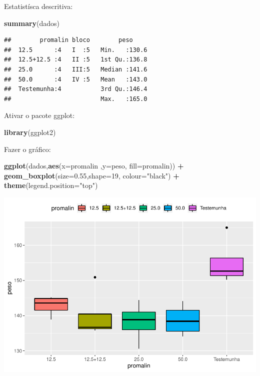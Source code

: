 \documentclass[
]{book}
\newenvironment{Shaded}{\begin{snugshade}}{\end{snugshade}}
\newcommand{\DataTypeTok}[1]{\textcolor[rgb]{0.13,0.29,0.53}{#1}}
\newcommand{\DecValTok}[1]{\textcolor[rgb]{0.00,0.00,0.81}{#1}}
\newcommand{\FloatTok}[1]{\textcolor[rgb]{0.00,0.00,0.81}{#1}}
\newcommand{\KeywordTok}[1]{\textcolor[rgb]{0.13,0.29,0.53}{\textbf{#1}}}
\newcommand{\NormalTok}[1]{#1}
\newcommand{\OperatorTok}[1]{\textcolor[rgb]{0.81,0.36,0.00}{\textbf{#1}}}
\newcommand{\StringTok}[1]{\textcolor[rgb]{0.31,0.60,0.02}{#1}}
\begin{document}
Estatistísca descritiva:

\begin{Shaded}
\begin{Highlighting}[]
\KeywordTok{summary}\NormalTok{(dados)}
\end{Highlighting}
\end{Shaded}

\begin{verbatim}
##        promalin bloco        peso      
##  12.5      :4   I  :5   Min.   :130.6  
##  12.5+12.5 :4   II :5   1st Qu.:136.8  
##  25.0      :4   III:5   Median :141.6  
##  50.0      :4   IV :5   Mean   :143.0  
##  Testemunha:4           3rd Qu.:146.4  
##                         Max.   :165.0
\end{verbatim}

Ativar o pacote ggplot:

\begin{Shaded}
\begin{Highlighting}[]
\KeywordTok{library}\NormalTok{(ggplot2)}
\end{Highlighting}
\end{Shaded}

Fazer o gráfico:

\begin{Shaded}
\begin{Highlighting}[]
\KeywordTok{ggplot}\NormalTok{(dados,}\KeywordTok{aes}\NormalTok{(}\DataTypeTok{x=}\NormalTok{promalin ,}\DataTypeTok{y=}\NormalTok{peso, }\DataTypeTok{fill=}\NormalTok{promalin)) }\OperatorTok{+}\StringTok{ }
\StringTok{      }\KeywordTok{geom_boxplot}\NormalTok{(}\DataTypeTok{size=}\FloatTok{0.55}\NormalTok{,}\DataTypeTok{shape=}\DecValTok{19}\NormalTok{, }\DataTypeTok{colour=}\StringTok{"black"}\NormalTok{) }\OperatorTok{+}\StringTok{ }
\StringTok{      }\KeywordTok{theme}\NormalTok{(}\DataTypeTok{legend.position=}\StringTok{"top"}\NormalTok{) }
\end{Highlighting}
\end{Shaded}

\includegraphics{TudodoR_files/figure-latex/unnamed-chunk-232-1.pdf}
\end{document}
